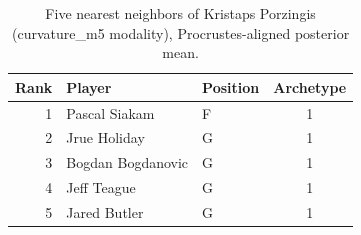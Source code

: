 \begin{table}[htbp]
  \centering\small
  \begin{tabular}{rllc}
    \toprule
    Rank & Player & Position & Archetype \\
    \midrule
    1 & Pascal Siakam & F & 1 \\
    2 & Jrue Holiday & G & 1 \\
    3 & Bogdan Bogdanovic & G & 1 \\
    4 & Jeff Teague & G & 1 \\
    5 & Jared Butler & G & 1 \\
    \bottomrule
  \end{tabular}
  \caption{Five nearest neighbors of Kristaps Porzingis (curvature_m5 modality), Procrustes-aligned posterior mean.}
  \label{tab:Kristaps_Porzingis_neighbors_curvature_m5}
\end{table}

